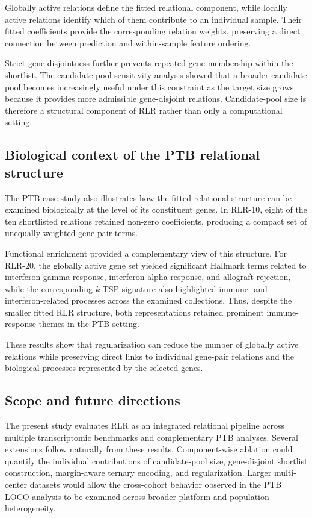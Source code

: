 \documentclass[preprint,12pt,a4paper]{elsarticle}
\begin{document}
Globally active relations define the fitted relational component, while locally active relations identify which of them contribute to an individual sample. Their fitted coefficients provide the corresponding relation weights, preserving a direct connection between prediction and within-sample feature ordering.

Strict gene disjointness further prevents repeated gene membership within the shortlist. The candidate-pool sensitivity analysis showed that a broader candidate pool becomes increasingly useful under this constraint as the target size grows, because it provides more admissible gene-disjoint relations. Candidate-pool size is therefore a structural component of RLR rather than only a computational setting.

\subsection{Biological context of the PTB relational structure}

The PTB case study also illustrates how the fitted relational structure can be examined biologically at the level of its constituent genes. In RLR-10, eight of the ten shortlisted relations retained non-zero coefficients, producing a compact set of unequally weighted gene-pair terms.

Functional enrichment provided a complementary view of this structure. For RLR-20, the globally active gene set yielded significant Hallmark terms related to interferon-gamma response, interferon-alpha response, and allograft rejection, while the corresponding $k$-TSP signature also highlighted immune- and interferon-related processes across the examined collections. Thus, despite the smaller fitted RLR structure, both representations retained prominent immune-response themes in the PTB setting.

These results show that regularization can reduce the number of globally active relations while preserving direct links to individual gene-pair relations and the biological processes represented by the selected genes.

\subsection{Scope and future directions}

The present study evaluates RLR as an integrated relational pipeline across multiple transcriptomic benchmarks and complementary PTB analyses. Several extensions follow naturally from these results. Component-wise ablation could quantify the individual contributions of candidate-pool size, gene-disjoint shortlist construction, margin-aware ternary encoding, and regularization. Larger multi-center datasets would allow the cross-cohort behavior observed in the PTB LOCO analysis to be examined across broader platform and population heterogeneity.
\end{document}
